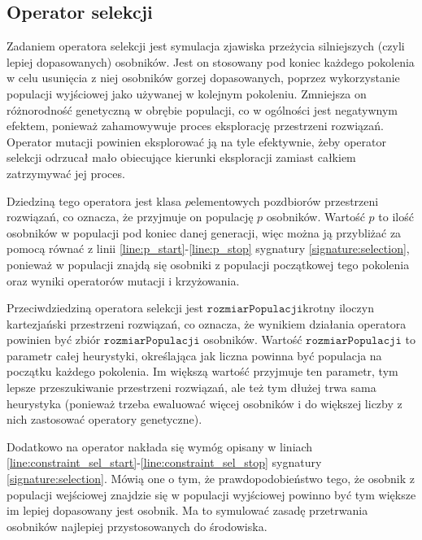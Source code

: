 \documentclass[twoside]{iisthesis}
\newcommand{\param}[1]{\mathtt{#1}}
\begin{document}
\subsection{Operator selekcji} \label{subsection:natSel}

Zadaniem operatora selekcji jest symulacja zjawiska przeżycia silniejszych (czyli lepiej dopasowanych) osobników. Jest on stosowany pod koniec każdego pokolenia w celu usunięcia z niej osobników gorzej dopasowanych, poprzez wykorzystanie populacji wyjściowej jako używanej w kolejnym pokoleniu. Zmniejsza on różnorodność genetyczną w obrębie populacji, co w ogólności jest negatywnym efektem, ponieważ zahamowywuje proces eksplorację przestrzeni rozwiązań. Operator mutacji powinien eksplorować ją na tyle efektywnie, żeby operator selekcji odrzucał mało obiecujące kierunki eksploracji zamiast całkiem zatrzymywać jej proces.

Dziedziną tego operatora jest klasa $p$elementowych pozdbiorów przestrzeni rozwiązań, co oznacza, że przyjmuje on populację $p$ osobników. Wartość $p$ to ilość osobników w populacji pod koniec danej generacji, więc można ją przybliżać za pomocą równać z linii \ref{line:p_start}-\ref{line:p_stop} sygnatury \ref{signature:selection}, ponieważ w populacji znajdą się osobniki z populacji początkowej tego pokolenia oraz wyniki operatorów mutacji i krzyżowania. 

Przeciwdziedziną operatora selekcji jest $\param{rozmiarPopulacji}$krotny iloczyn kartezjański przestrzeni rozwiązań, co oznacza, że wynikiem działania operatora powinien być zbiór $\param{rozmiarPopulacji}$ osobników. Wartość $\param{rozmiarPopulacji}$ to parametr całej heurystyki, określająca jak liczna powinna być populacja na początku każdego pokolenia. Im większą wartość przyjmuje ten parametr, tym lepsze przeszukiwanie przestrzeni rozwiązań, ale też tym dłużej trwa sama heurystyka (ponieważ trzeba ewaluować więcej osobników i do większej liczby z nich zastosować operatory genetyczne). 

Dodatkowo na operator nakłada się wymóg opisany w liniach \ref{line:constraint_sel_start}-\ref{line:constraint_sel_stop} sygnatury \ref{signature:selection}. Mówią one o tym, że prawdopodobieństwo tego, że osobnik z populacji wejściowej znajdzie się w populacji wyjściowej powinno być tym większe im lepiej dopasowany jest osobnik. Ma to symulować zasadę przetrwania osobników najlepiej przystosowanych do środowiska.
\end{document}
